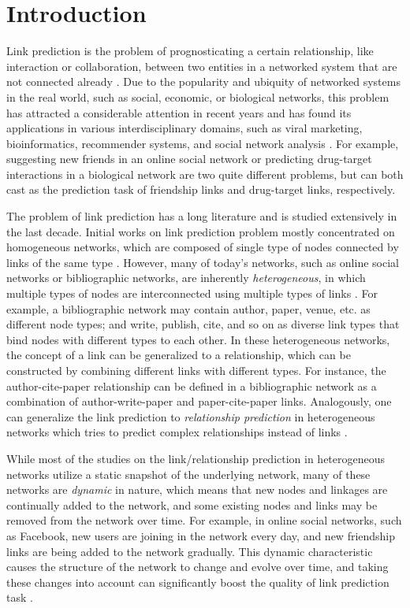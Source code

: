 \section{Introduction}\label{sec:intro}
Link prediction is the problem of prognosticating a certain relationship, like interaction or collaboration, between two entities in a networked system that are not connected already \cite{lu2011link}. Due to the popularity and ubiquity of networked systems in the real world, such as social, economic, or biological networks, this problem has attracted a considerable attention in recent years and has found its applications in various interdisciplinary domains, such as viral marketing, bioinformatics, recommender systems, and social network analysis \cite{wasserman1994social}. For example, suggesting new friends in an online social network \cite{liben2007link} or predicting drug-target interactions in a biological network \cite{chen2012drug} are two quite different problems, but can both cast as the prediction task of friendship links and drug-target links, respectively.

The problem of link prediction has a long literature and is studied extensively in the last decade. Initial works on link prediction problem mostly concentrated on homogeneous networks, which are composed of single type of nodes connected by links of the same type \cite{liben2007link, wang2007local, lichtenwalter2010new}. However, many of today's networks, such as online social networks or bibliographic networks, are inherently \emph{heterogeneous}, in which multiple types of nodes are interconnected using multiple types of links \cite{taskar2004link, shi2017survey}. For example, a bibliographic network may contain author, paper, venue, etc. as different node types; and write, publish, cite, and so on as diverse link types that bind nodes with different types to each other. In these heterogeneous networks, the concept of a link can be generalized to a relationship, which can be constructed by combining different links with different types. For instance, the author-cite-paper relationship can be defined in a bibliographic network as a combination of author-write-paper and paper-cite-paper links. Analogously, one can generalize the link prediction to \emph{relationship prediction} in heterogeneous networks which tries to predict complex relationships instead of links \cite{sun2012will}.

While most of the studies on the link/relationship prediction in heterogeneous networks utilize a static snapshot of the underlying network, many of these networks are \emph{dynamic} in nature, which means that new nodes and linkages are continually added to the network, and some existing nodes and links may be removed from the network over time. For example, in online social networks, such as Facebook, new users are joining in the network every day, and new friendship links are being added to the network gradually. This dynamic characteristic causes the structure of the network to change and evolve over time, and taking these changes into account can significantly boost the quality of link prediction task \cite{potgieter2009temporality}.

